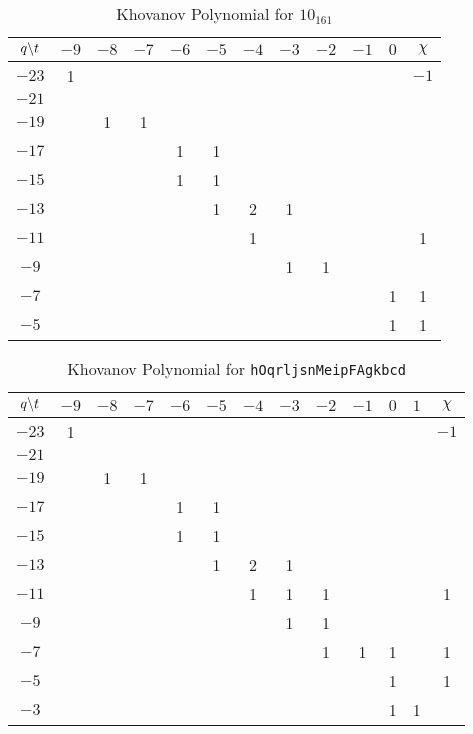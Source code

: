     \begin{table}
        \centering
        \begin{tabular}{| c | c | c | c | c | c | c | c | c | c | c | c |}
            \hline
            $q\symbol{92}t$&$-9$&$-8$&$-7$&$-6$&$-5$&$-4$&$-3$&$-2$&$-1$&$0$&$\chi$\\
            \hline
            $-23$&1&&&&&&&&&&$-1$\\
            \hline
            $-21$&&&&&&&&&&&\\
            \hline
            $-19$&&1&1&&&&&&&&\\
            \hline
            $-17$&&&&1&1&&&&&&\\
            \hline
            $-15$&&&&1&1&&&&&&\\
            \hline
            $-13$&&&&&1&2&1&&&&\\
            \hline
            $-11$&&&&&&1&&&&&1\\
            \hline
            $-9$&&&&&&&1&1&&&\\
            \hline
            $-7$&&&&&&&&&&1&1\\
            \hline
            $-5$&&&&&&&&&&1&1\\
            \hline
        \end{tabular}
        \caption{Khovanov Polynomial for $10_{161}$}
    \end{table}
    \begin{table}
        \centering
        \begin{tabular}{| c | c | c | c | c | c | c | c | c | c | c | c | c |}
            \hline
            $q\symbol{92}t$&$-9$&$-8$&$-7$&$-6$&$-5$&$-4$&$-3$&$-2$&$-1$&$0$&$1$&$\chi$\\
            \hline
            $-23$&1&&&&&&&&&&&$-1$\\
            \hline
            $-21$&&&&&&&&&&&&\\
            \hline
            $-19$&&1&1&&&&&&&&&\\
            \hline
            $-17$&&&&1&1&&&&&&&\\
            \hline
            $-15$&&&&1&1&&&&&&&\\
            \hline
            $-13$&&&&&1&2&1&&&&&\\
            \hline
            $-11$&&&&&&1&1&1&&&&1\\
            \hline
            $-9$&&&&&&&1&1&&&&\\
            \hline
            $-7$&&&&&&&&1&1&1&&1\\
            \hline
            $-5$&&&&&&&&&&1&&1\\
            \hline
            $-3$&&&&&&&&&&1&1&\\
            \hline
        \end{tabular}
        \caption{Khovanov Polynomial for \texttt{hOqrljsnMeipFAgkbcd}}
    \end{table}
